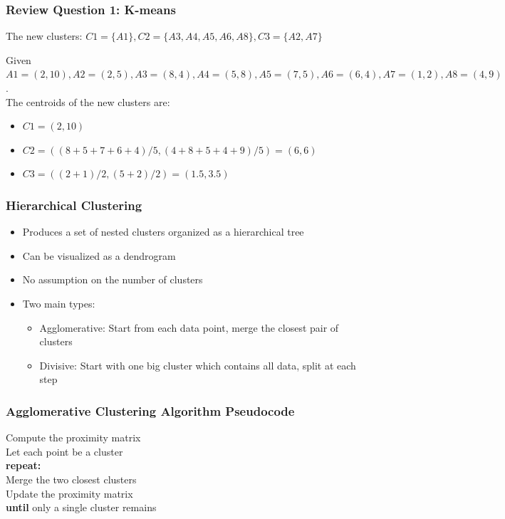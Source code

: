 \documentclass[aspectratio=169, 10pt]{beamer}
\begin{document}
\begin{frame}
    \frametitle{Review Question 1: K-means}
    \small
    
    The new clusters: $C1=\{A1\},C2=\{A3, A4, A5, A6, A8\}, C3=\{A2, A7\}$
    \vspace{1em}

    Given $A1=(2,10), A2=(2,5), A3=(8,4), A4=(5,8), A5=(7,5), A6=(6,4), A7=(1,2), A8=(4,9)$.\\
    The centroids of the new clusters are:
    \begin{itemize}
        \item $C1 = (2, 10)$
        \item $C2 = ((8+5+7+6+4)/5,(4+8+5+4+9)/5)=(6,6)$
        \item $C3 = ((2+1)/2,(5+2)/2) = (1.5, 3.5)$
    \end{itemize}
\end{frame}

\begin{frame}
    \frametitle{Hierarchical Clustering}
    
    \begin{itemize}
        \item Produces a set of nested clusters organized as a hierarchical tree
        \item Can be visualized as a dendrogram
        \item No assumption on the number of clusters
        \item Two main types:
            \begin{itemize}
                \item Agglomerative: Start from each data point, merge the closest pair of clusters
                \item Divisive: Start with one big cluster which contains all data, split at each step
            \end{itemize}
    \end{itemize}
    
\end{frame}

\begin{frame}
    \frametitle{Agglomerative Clustering Algorithm Pseudocode}
    
    \hrulefill \par

    \begin{tabbing}
        Compute the proximity matrix\\
        Let each point be a cluster\\
        \textbf{repeat:}\=\\
        \> Merge the two closest clusters\\
        \> Update the proximity matrix\\
        \textbf{until} only a single cluster remains
    \end{tabbing}

    \hrulefill \par
    
\end{frame}
\end{document}
